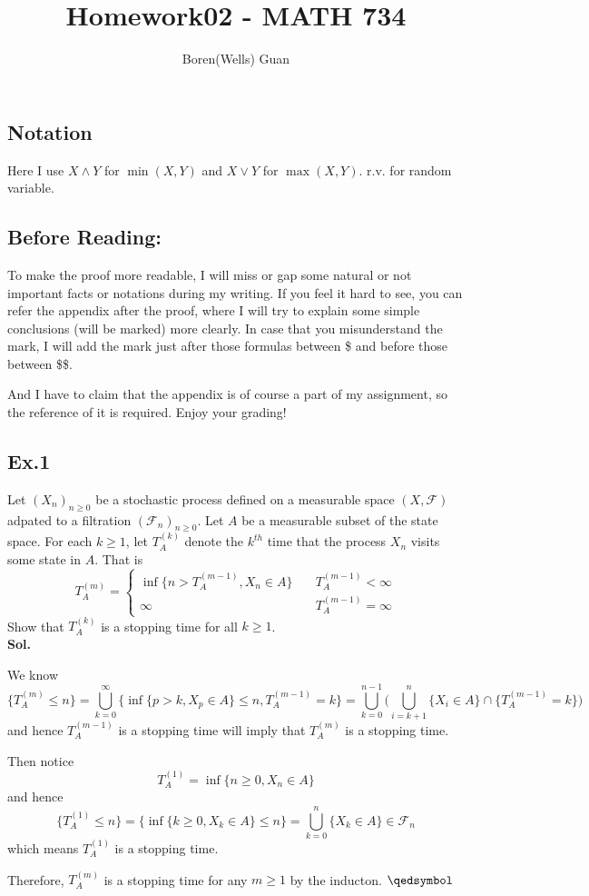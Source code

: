 \documentclass[lang=en,11pt,a4paper,citestyle =authoryear]{elegantpaper}
\title{Homework02 - MATH 734}
\author{Boren(Wells) Guan}
\newcommand{\prvd}{$\hfill \qedsymbol$}
\newcommand{\F}{\mathcal{F}}
\begin{document}
\maketitle

\subsection*{Notation}
Here I use $X \wedge Y$ for $\min(X,Y)$ and $X\vee Y$ for $\max(X,Y)$. r.v. for random variable.

\subsection*{Before Reading:}\par
To make the proof more readable, I will miss or gap some natural or not important facts or notations during my writing. If you feel it hard to see, you can refer the appendix after the proof, where I will try to explain some simple conclusions (will be marked) more clearly. In case that you misunderstand the mark, I will add the mark just after those formulas between \$ and before those between \$\$.\par
And I have to claim that the appendix is of course a part of my assignment, so the reference of it is required. Enjoy your grading!

\subsection*{Ex.1} 
Let $(X_n)_{n\geq 0}$ be a stochastic process defined on a measurable space $(X,\F)$ adpated to a filtration $(\F_n)_{n\geq 0}$. Let $A$ be a measurable subset of the state space. For each $k\geq 1$, let $T_A^{(k)}$ denote the $k^{th}$ time that the process $X_n$ visits some state in $A$. That is
\[
T_A^{(m)} = \begin{cases}\inf\{n>T_A^{(m-1)}, X_n\in A\}\quad&T_A^{(m-1)} < \infty \\ \infty &T_A^{(m-1)} = \infty\end{cases}
\]
Show that $T_A^{(k)}$ is a stopping time for all $k\geq 1$.
\vspace{0.5em}\\
\textbf{Sol.} \par
We know
\[
\{T_A^{(m)} \leq n\} = \bigcup_{k=0}^{\infty}\{\inf\{p>k, X_p \in A\} \leq n, T_A^{(m-1)} = k\} = \bigcup_{k=0}^{n-1} \Big(\bigcup_{i = k+1}^n \{X_i \in A\}\cap\{T_A^{(m-1)} = k\}\Big)
\]
and hence $T_A^{(m-1)}$ is a stopping time will imply that $T_A^{(m)}$ is a stopping time.\par
Then notice
\[
T_A^{(1)} = \inf\{n\geq 0, X_n \in A\}
\]
and hence
\[
\{T_A^{(1)} \leq n\} = \{\inf\{k\geq 0, X_k \in A\} \leq n\} = \bigcup_{k=0}^n\{X_k\in A\} \in \F_n
\]
which means $T_A^{(1)}$ is a stopping time.\par
Therefore, $T_A^{(m)}$ is a stopping time for any $m\geq 1$ by the inducton.
\prvd
\vspace{0.5em}
\end{document}
